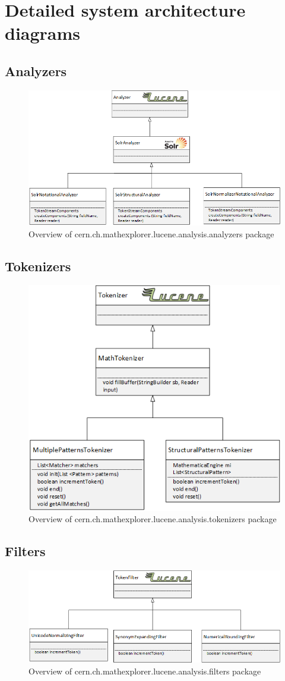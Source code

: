 \chapter{Detailed system architecture diagrams}

\section{Analyzers}
\begin{figure}[h!]
	\centering
	\includegraphics[height=4 cm]{visio_drawings/analyzers.png}
	\caption{Overview of {\small{\codefont cern.ch.mathexplorer.lucene.analysis.analyzers}} package}
	\label{uml_analyzers}
\end{figure}

\section{Tokenizers}
\begin{figure}[h!]
	\centering
	\includegraphics[height=4 cm]{visio_drawings/tokenizers.png}
	\caption{Overview of {\small{\codefont cern.ch.mathexplorer.lucene.analysis.tokenizers}} package}
	\label{uml_tokenizers}
\end{figure}

\section{Filters}
\begin{figure}[h!]
	\centering
	\includegraphics[height=4 cm]{visio_drawings/filters.png}
	\caption{Overview of {\small{\codefont cern.ch.mathexplorer.lucene.analysis.filters}} package}
	\label{uml_filters}
\end{figure}

